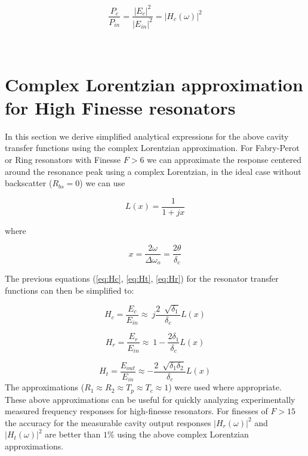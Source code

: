 \documentclass[10pt]{article}
\begin{document}
\begin{equation} 
\frac{P_{c}}{P_{in}} = \frac{|E_{c}|^2}{|E_{in}|^2}  = |H_c(\omega)|^2
\end{equation}

~

\section{Complex Lorentzian approximation for High Finesse resonators }

In this section we derive simplified analytical expressions for the above cavity transfer functions using the complex Lorentzian approximation.  For Fabry-Perot or Ring resonators with Finesse $F>6$ we can approximate the response centered around the resonance peak using a complex Lorentzian, in the ideal case without backscatter ($R_{bs} = 0$) we can use

\begin{equation}
L(x)  = \frac{1}{1+jx}
\label{eq:Lx}
\end{equation}

\noindent  where

\begin{equation}
x = \frac{2\omega}{\Delta \omega_o} = \frac{2\theta}{\delta_c}
\end{equation}

\noindent  The previous equations (\ref{eq:Hc}, \ref{eq:Ht}, \ref{eq:Hr}) for the resonator transfer functions can then be simplified to: 

\begin{equation}
H_c = \frac{E_{c}}{E_{in}}  \approx ~ j \frac{ 2~ \sqrt[]{\delta_1}}{\delta_c}  L(x)
\end{equation}

\begin{equation}
H_r = \frac{E_r}{E_{in}} \approx ~ 1 -\frac{2\delta_1}{\delta_c} L(x) 
\label{eq:Hra}
\end{equation}

\begin{equation}
H_t = \frac{E_{out}}{E_{in}} \approx  - \frac{ 2~ \sqrt[]{\delta_1 \delta_2}}{\delta_c}  L(x)
\end{equation}  
\newline
\noindent  The approximations ($ R_1 \approx R_2 \approx T_p \approx T_c \approx 1 $) were used where appropriate.     These above approximations can be useful for quickly analyzing experimentally measured frequency responses for high-finesse resonators.   For finesses of $F>15$ the accuracy for the measurable cavity output responses $|H_r(\omega)|^2$ and  $|H_t(\omega)|^2$ are better than $1\%$ using the above complex Lorentzian approximations.  
\end{document}
